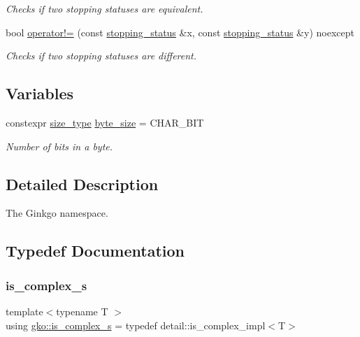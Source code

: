 \begin{DoxyCompactItemize}
\begin{DoxyCompactList}\small\item\em Checks if two stopping statuses are equivalent. \end{DoxyCompactList}\item 
bool \hyperlink{namespacegko_accf1dbf5054c76e154490d825b0f44ee}{operator!=} (const \hyperlink{classgko_1_1stopping__status}{stopping\+\_\+status} \&x, const \hyperlink{classgko_1_1stopping__status}{stopping\+\_\+status} \&y) noexcept
\begin{DoxyCompactList}\small\item\em Checks if two stopping statuses are different. \end{DoxyCompactList}\end{DoxyCompactItemize}
\subsection*{Variables}
\begin{DoxyCompactItemize}
\item 
\mbox{\label{namespacegko_acae2e648052ec788bd8ba9e0192652a6}} 
constexpr \hyperlink{namespacegko_a6e5c95df0ae4e47aab2f604a22d98ee7}{size\+\_\+type} \hyperlink{namespacegko_acae2e648052ec788bd8ba9e0192652a6}{byte\+\_\+size} = C\+H\+A\+R\+\_\+\+B\+IT
\begin{DoxyCompactList}\small\item\em Number of bits in a byte. \end{DoxyCompactList}\end{DoxyCompactItemize}


\subsection{Detailed Description}
The Ginkgo namespace. 

\subsection{Typedef Documentation}
\mbox{\label{namespacegko_aeede19206954d5c8ebd04c95cf63bb88}} 
\subsubsection{\texorpdfstring{is\+\_\+complex\+\_\+s}{is\_complex\_s}}
{\footnotesize\ttfamily template$<$typename T $>$ \\
using \hyperlink{namespacegko_aeede19206954d5c8ebd04c95cf63bb88}{gko\+::is\+\_\+complex\+\_\+s} = typedef detail\+::is\+\_\+complex\+\_\+impl$<$T$>$}



